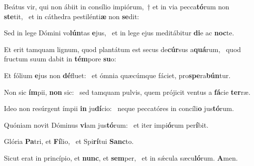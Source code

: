 \item Beátus vir, qui non ábiit in consílio impiórum,~† et in via pecca\textbf{tó}rum non \textbf{ste}tit,~\psstar{} et in cáthedra pestilénti\textbf{æ} non \textbf{se}dit:
\item Sed in lege Dómini vo\textbf{lún}tas \textbf{e}jus,~\psstar{} et in lege ejus meditábitur \textbf{di}e ac \textbf{noc}te.
\item Et erit tamquam lignum, quod plantátum est secus de\textbf{cúr}sus a\textbf{quá}rum,~\psstar{} quod fructum suum dabit in \textbf{tém}pore \textbf{su}o:
\item Et fólium \textbf{e}jus non \textbf{dé}fluet:~\psstar{} et ómnia quæcúmque fáciet, pro\textbf{spe}ra\textbf{bún}tur.
\item Non sic \textbf{ím}pii, \textbf{non} sic:~\psstar{} sed tamquam pulvis, quem prójicit ventus a \textbf{fá}cie \textbf{ter}ræ.
\item Ideo non resúrgent ímpii \textbf{in} ju\textbf{dí}cio:~\psstar{} neque peccatóres in concíli\textbf{o} jus\textbf{tó}rum.
\item Quóniam novit Dóminus \textbf{vi}am jus\textbf{tó}rum:~\psstar{} et iter impi\textbf{ó}rum per\textbf{í}bit.
\item Glória \textbf{Pa}tri, et \textbf{Fí}lio,~\psstar{} et Spi\textbf{rí}tui \textbf{Sanc}to.
\item Sicut erat in princípio, et \textbf{nunc}, et \textbf{sem}per,~\psstar{} et in sǽcula sæcu\textbf{ló}rum. \textbf{A}men.
